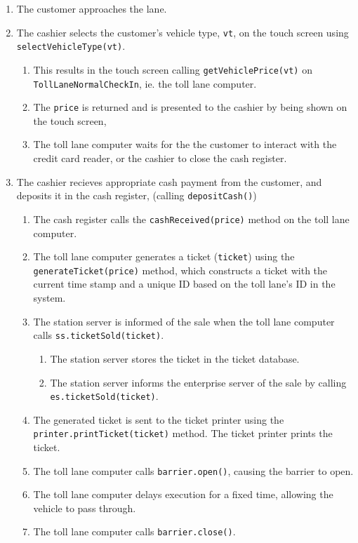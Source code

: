 \begin{enumerate}
\item The customer approaches the lane.
\item The cashier selects the customer's vehicle type, \texttt{vt}, on the touch screen using \texttt{selectVehicleType(vt)}.
	\begin{enumerate}
	\item This results in the touch screen calling \texttt{getVehiclePrice(vt)} on \texttt{TollLaneNormalCheckIn}, ie. the toll lane computer. 
	\item The \texttt{price} is returned and is presented to the cashier by being shown on the touch screen, 
	\item The toll lane computer waits for the the customer to interact with the credit card reader, or the cashier to close the cash register.
	\end{enumerate}
\item The cashier recieves appropriate cash payment from the customer, and deposits it in the cash register, (calling \texttt{depositCash()})
	\begin{enumerate}
	\item The cash register calls the \texttt{cashReceived(price)} method on the toll lane computer.
	\item \label{generate_ticket} The toll lane computer generates a ticket (\texttt{ticket}) using the \texttt{generateTicket(price)} method, which constructs a ticket with the current time stamp and a unique ID based on the toll lane's ID in the system.
	\item The station server is informed of the sale when the toll lane computer calls \texttt{ss.ticketSold(ticket)}.
		\begin{enumerate}
		\item The station server stores the ticket in the ticket database.
		\item The station server informs the enterprise server of the sale by calling \texttt{es.ticketSold(ticket)}.
		\end{enumerate}
	\item The generated ticket is sent to the ticket printer using the \texttt{printer.printTicket(ticket)} method. The ticket printer prints the ticket.
	\item The toll lane computer calls \texttt{barrier.open()}, causing the barrier to open.
	\item The toll lane computer delays execution for a fixed time, allowing the vehicle to pass through.
	\item The toll lane computer calls \texttt{barrier.close()}.
	\end{enumerate}
	
\end{enumerate}


